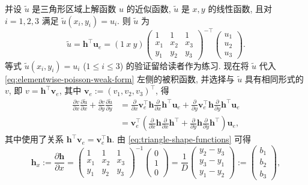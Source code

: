 {并设 $\widetilde u$ 是三角形区域上解函数 $u$ 的近似函数, $\widetilde u$ 是 $x,y$ 的线性函数, 且对 $i=1,2,3$ 满足 $\widetilde u(x_i,y_i)=u_i$. 则 $\widetilde u$ 为}
\begin{equation}\label{eq:triangle-linear-interpolant}
\widetilde u=\boldsymbol{h}^{\top}\boldsymbol{u}_e=(1\ x\ y)\begin{pmatrix}1&1&1\\x_1&x_2&x_3\\y_1&y_2&y_3\end{pmatrix}^{-\top}\begin{pmatrix}u_1\\u_2\\u_3\end{pmatrix}.
\end{equation}
{等式 $\widetilde u(x_i,y_i)=u_i$ ($1\le i\le3$) 的验证留给读者作为练习.}
{现在将 $\widetilde u$ 代入 \eqref{eq:elementwise-poisson-weak-form} 左侧的被积函数, 并选择与 $\widetilde u$ 具有相同形式的 $v$, 即 $v=\boldsymbol{h}^{\top}\boldsymbol{v}_e$, 其中 $\boldsymbol{v}_e:=(v_1,v_2,v_3)^{\top}$, 得}
\[\begin{aligned}
\frac{\partial v}{\partial x}\frac{\partial\widetilde u}{\partial x}+\frac{\partial v}{\partial y}\frac{\partial\widetilde u}{\partial y}
&=\frac{\partial}{\partial x}\boldsymbol{v}_e^{\top}\boldsymbol{h}\frac{\partial}{\partial x}\boldsymbol{h}^{\top}\boldsymbol{u}_e+\frac{\partial}{\partial y}\boldsymbol{v}_e^{\top}\boldsymbol{h}\frac{\partial}{\partial y}\boldsymbol{h}^{\top}\boldsymbol{u}_e\\
&=\boldsymbol{v}_e^{\top}\left(\frac{\partial}{\partial x}\boldsymbol{h}\frac{\partial}{\partial x}\boldsymbol{h}^{\top}+\frac{\partial}{\partial y}\boldsymbol{h}\frac{\partial}{\partial y}\boldsymbol{h}^{\top}\right)\boldsymbol{u}_e,
\end{aligned}\]
{其中使用了关系 $\boldsymbol{h}^{\top}\boldsymbol{v}_e=\boldsymbol{v}_e^{\top}\boldsymbol{h}$. 由 \eqref{eq:triangle-shape-functions} 可得}
\begin{equation}\label{eq:triangle-shape-x-derivative}
\boldsymbol{h}_x:=\frac{\partial\boldsymbol{h}}{\partial x}
=\begin{pmatrix}1&1&1\\x_1&x_2&x_3\\y_1&y_2&y_3\end{pmatrix}^{-1}\begin{pmatrix}0\\1\\0\end{pmatrix}
=\frac1D\begin{pmatrix}y_2-y_3\\y_3-y_1\\y_1-y_2\end{pmatrix}:=\begin{pmatrix}b_1\\b_2\\b_3\end{pmatrix},
\end{equation}
